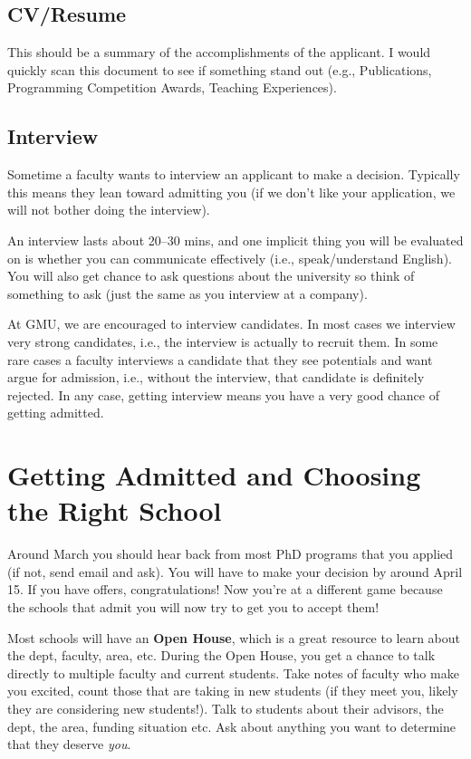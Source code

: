 \documentclass[10pt]{article}
\begin{document}
\subsection{CV/Resume}
This should be a summary of the accomplishments of the applicant.  I would quickly scan this document to see if something stand out (e.g., Publications, Programming Competition Awards, Teaching Experiences).

\subsection{Interview}

Sometime a faculty wants to interview an applicant to make a decision. Typically this means they lean toward admitting you (if we don't like your application, we will not bother doing the interview).

An interview lasts about 20--30 mins, and one implicit thing you will be evaluated on is whether you can communicate effectively (i.e., speak/understand English).  You will also get chance to ask questions about the university so think of something to ask (just the same as you interview at a company).

\begin{tcolorbox}[left=1pt,right=1pt,top=1pt,bottom=1pt]
At GMU, we are encouraged to interview candidates. In most cases we interview very strong candidates, i.e., the interview is actually to recruit them.  In some rare cases a faculty interviews a candidate that they see potentials and want argue for admission, i.e., without the interview, that candidate is definitely rejected. In any case, getting interview means you have a very good chance of getting admitted.
\end{tcolorbox}

\section{Getting Admitted and Choosing the Right School}

Around March you should hear back from most PhD programs that you applied (if not, send email and ask). You will have to make your decision by around April 15.
If you have offers, congratulations!  Now you're at a different game because the schools that admit you will now try to get you to accept them!  

Most schools will have an \textbf{Open House}, which is a great resource to learn about the dept, faculty, area, etc. During the Open House, you get a chance to talk directly to multiple faculty and current students.  Take notes of faculty who make you excited, count those that are taking in new students (if they meet you, likely they are considering new students!).  Talk to students about their advisors, the dept, the area, funding situation etc.  Ask about anything you want to determine that they deserve \emph{you}.
\end{document}
